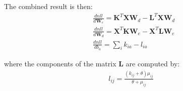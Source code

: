 \documentclass[11pt]{letter}
\newcommand{\matr}[1]{\mathbf{#1}}
\begin{document}
The combined result is then:
\begin{align*}
&\frac{dnll}{d\matr{W}_e} = \matr{K}^T \matr{X} \matr{W}_d - \matr{L}^T \matr{X} \matr{W}_d \\
&\frac{dnll}{d\matr{W}_d} = \matr{X}^T \matr{K} \matr{W}_e - \matr{X}^T \matr{L} \matr{W}_e \\
&\frac{dnll}{db_a} = \sum_{i} k_{ia} - l_{ia}
\end{align*}

where the components of the matrix $\matr{L}$ are computed by:
\begin{align*}
l_{ij} = \frac{(k_{ij} + \theta) \mu_{ij}}{\theta + \mu_{ij}}   
\end{align*}
\end{document}
